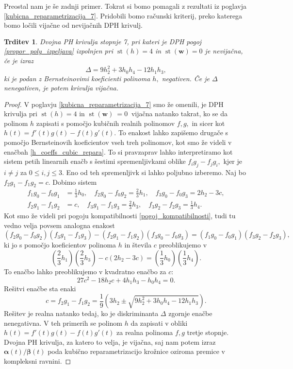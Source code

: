 \documentclass[12pt,a4paper,twoside]{article}
\theoremstyle{definition} %
\theoremstyle{plain} %
\newtheorem{trditev}[definicija]{Trditev}
\theoremstyle{primerstyle}
\numberwithin{equation}{section}  %
\newcommand{\wV}{\mathbf{w}}
\newcommand{\balpha}{\boldsymbol \alpha}
\newcommand{\bbeta}{\boldsymbol \beta}
\DeclareMathOperator{\st}{st}
\begin{document}
Preostal nam je še zadnji primer. Tokrat si bomo pomagali z rezultati iz poglavja \ref{kubicna_reparametrizacija_7}. Pridobili bomo računski kriterij, preko katerega bomo ločili vijačne od nevijačnih DPH krivulj.
\begin{trditev}
	\label{trditev_locevanje_h4w0}
	Dvojna PH krivulja stopnje 7, pri kateri je DPH pogoj \eqref{propor_poly_izpeljava} izpolnjen pri $\st(h)=4$ in $\st(\wV)=0$ je nevijačna, če je izraz
	\begin{equation}
		\label{diskriminanta}
		\Delta=9h_2^2+3h_0h_4-12h_1h_3,
	\end{equation}
	ki je podan z Bernsteinovimi koeficienti polinoma $h,$ negativen. Če je $\Delta$ nenegativen, je potem krivulja vijačna.
\end{trditev}
\begin{proof}
	V poglavju \ref{kubicna_reparametrizacija_7} smo že omenili, je DPH krivulja pri $\st(h)=4$ in $\st(\wV)~=0~$ vijačna natanko takrat, ko se da polinom $h$ zapisati s pomočjo kubičnih realnih polinomov $f,g,$ in sicer kot $h(t)=f'(t)g(t)-f(t)g'(t).$ To enakost lahko zapišemo drugače s pomočjo Bernsteinovih koeficientov vseh treh polinomov, kot smo že videli v enačbah \eqref{h_coeffs_cubic_repara}. To si pravzaprav lahko interpretiramo kot sistem petih linearnih enačb s šestimi spremenljivkami oblike $f_ig_j-f_jg_i,$ kjer je $i\neq j$ za $0\leq i,j\leq 3.$ Eno od teh spremenljivk si lahko poljubno izberemo. Naj bo $f_2g_1-f_1g_2=c.$ Dobimo sistem
	\begin{align*}
		f_1g_0-f_0g_1&=\frac{1}{3}h_0,\quad f_2g_0-f_0g_2=\frac{2}{3}h_1,\quad f_3g_0-f_0g_3=2h_2-3c,\\
		f_2g_1-f_1g_2&=c,\quad f_3g_1-f_1g_3=\frac{2}{3}h_3,\quad f_3g_2-f_2g_3=\frac{1}{3}h_4.
	\end{align*}
	Kot smo že videli pri pogoju kompatibilnosti \eqref{pogoj_kompatibilnosti}, tudi tu vedno velja povsem analogna enakost
	\begin{equation*}
		(f_2g_0-f_0g_2)(f_3g_1-f_1g_3)-(f_2g_1-f_1g_2)(f_3g_0-f_0g_3)=(f_1g_0-f_0g_1)(f_3g_2-f_2g_3),
	\end{equation*}
	ki jo s pomočjo koeficientov polinoma $h$ in števila $c$ preoblikujemo v
	\begin{equation*}
		\left(\frac{2}{3}h_1\right)\left(\frac{2}{3}h_3\right)-c(2h_2-3c)=\left(\frac{1}{3}h_0\right)\left(\frac{1}{3}h_4\right).
	\end{equation*}
	To enačbo lahko preoblikujemo v kvadratno enačbo za $c:$
	\begin{equation*}
		27c^2-18h_2c+4h_1h_3-h_0h_4=0.
	\end{equation*}
	Rešitvi enačbe sta enaki
	\begin{equation*}
		c=f_2g_1-f_1g_2=\frac{1}{9}\left(3h_2\pm\sqrt{9h_2^2+3h_0h_4-12h_1h_3}\right).
	\end{equation*}
	Rešitev je realna natanko tedaj, ko je diskriminanta $\Delta$ zgornje enačbe nenegativna. V teh primerih se polinom $h$ da zapisati v obliki $h(t)=f'(t)g(t)-f(t)g'(t)$ za realna polinoma $f,g$ tretje stopnje. Dvojna PH krivulja, za katero to velja, je vijačna, saj nam potem izraz $\balpha(t)/\bbeta(t)$ poda kubično reparametrizacijo krožnice oziroma premice v kompleksni ravnini.
	

\end{proof}
\end{document}
